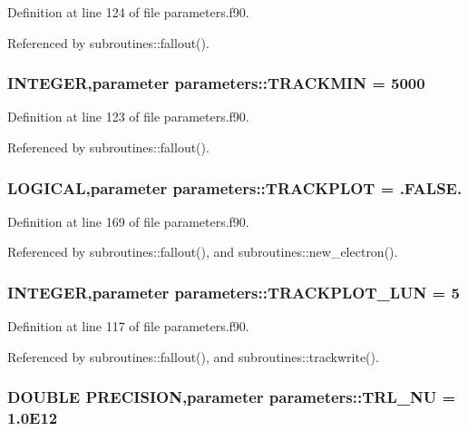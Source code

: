 Definition at line 124 of file parameters.f90.

Referenced by subroutines::fallout().\hypertarget{namespaceparameters_a3274d98430ff0a8089ad7f2b21e16d17}{
\subsubsection[{TRACKMIN}]{\setlength{\rightskip}{0pt plus 5cm}INTEGER,parameter {\bf parameters::TRACKMIN} = 5000}}
\label{namespaceparameters_a3274d98430ff0a8089ad7f2b21e16d17}


Definition at line 123 of file parameters.f90.

Referenced by subroutines::fallout().\hypertarget{namespaceparameters_a687b46ca494c1998df909a6461e3b535}{
\subsubsection[{TRACKPLOT}]{\setlength{\rightskip}{0pt plus 5cm}LOGICAL,parameter {\bf parameters::TRACKPLOT} = .FALSE.}}
\label{namespaceparameters_a687b46ca494c1998df909a6461e3b535}


Definition at line 169 of file parameters.f90.

Referenced by subroutines::fallout(), and subroutines::new\_\-electron().\hypertarget{namespaceparameters_a0818b4c220711dedc53641b60887957a}{
\subsubsection[{TRACKPLOT\_\-LUN}]{\setlength{\rightskip}{0pt plus 5cm}INTEGER,parameter {\bf parameters::TRACKPLOT\_\-LUN} = 5}}
\label{namespaceparameters_a0818b4c220711dedc53641b60887957a}


Definition at line 117 of file parameters.f90.

Referenced by subroutines::fallout(), and subroutines::trackwrite().\hypertarget{namespaceparameters_ae757acf24cb9ac4ea176759b5ada37c7}{
\subsubsection[{TRL\_\-NU}]{\setlength{\rightskip}{0pt plus 5cm}DOUBLE PRECISION,parameter {\bf parameters::TRL\_\-NU} = 1.0E12}}
\label{namespaceparameters_ae757acf24cb9ac4ea176759b5ada37c7}


